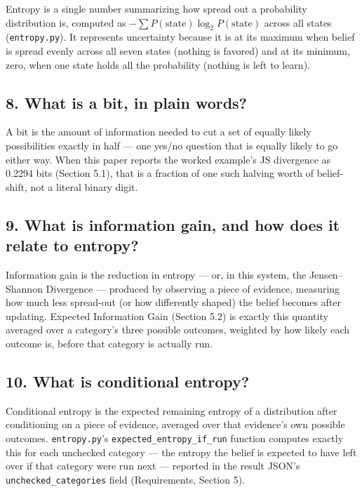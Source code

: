 \documentclass[11pt]{article}
\begin{document}
Entropy is a single number summarizing how spread out a probability distribution is, computed as $-\sum P(\text{state})\log_2P(\text{state})$ across all states (\texttt{entropy.py}). It represents uncertainty because it is at its maximum when belief is spread evenly across all seven states (nothing is favored) and at its minimum, zero, when one state holds all the probability (nothing is left to learn).

\subsection*{8. What is a bit, in plain words?}

A bit is the amount of information needed to cut a set of equally likely possibilities exactly in half --- one yes/no question that is equally likely to go either way. When this paper reports the worked example's JS divergence as 0.2294 bits (Section 5.1), that is a fraction of one such halving worth of belief-shift, not a literal binary digit.

\subsection*{9. What is information gain, and how does it relate to entropy?}

Information gain is the reduction in entropy --- or, in this system, the Jensen--Shannon Divergence --- produced by observing a piece of evidence, measuring how much less spread-out (or how differently shaped) the belief becomes after updating. Expected Information Gain (Section 5.2) is exactly this quantity averaged over a category's three possible outcomes, weighted by how likely each outcome is, before that category is actually run.

\subsection*{10. What is conditional entropy?}

Conditional entropy is the expected remaining entropy of a distribution after conditioning on a piece of evidence, averaged over that evidence's own possible outcomes. \texttt{entropy.py}'s \texttt{expected\_entropy\_if\_run} function computes exactly this for each unchecked category --- the entropy the belief is expected to have left over if that category were run next --- reported in the result JSON's \texttt{unchecked\_categories} field (Requirements, Section 5).
\end{document}
